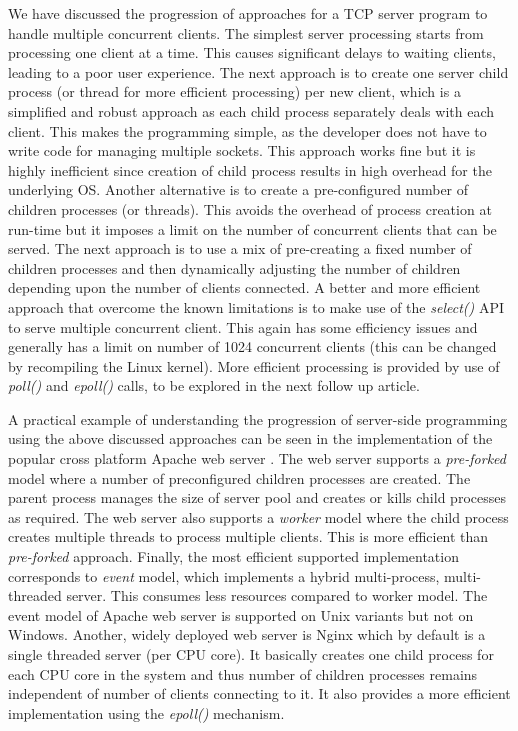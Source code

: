 \begin{multicols}{2}
We have discussed the progression of approaches for a TCP server program to handle multiple concurrent clients. The simplest server processing starts from processing one client at a time. This causes significant delays to waiting clients, leading to a poor user experience. The next approach is to create one server child process (or thread for more efficient processing) per new client, which is a simplified and robust approach as each child process separately deals with each client. This makes the programming simple, as the developer does not have to write code for managing multiple sockets. This approach works fine but it is highly inefficient since creation of child process results in high overhead for the underlying OS. Another alternative is to create a pre-configured number of children processes (or threads). This avoids the overhead of process creation at run-time but it imposes a limit on the number of concurrent clients that can be served. The next approach is to use a mix of pre-creating a fixed number of children processes and then dynamically adjusting the number of children depending upon the number of clients connected. A better and more efficient approach that overcome the known limitations is to make use of the \textit{select()} API to serve multiple concurrent client. This again has some efficiency issues and generally has a limit on number of 1024 concurrent clients (this can be changed by recompiling the Linux kernel). More efficient processing is provided by use of \textit{poll()} and \textit{epoll()} calls, to be explored in the next follow up article.

A practical example of understanding the progression of server-side programming using the above discussed approaches can be seen in the implementation of the popular cross platform Apache web server \cite{art1-key04}. The web server supports a \textit{pre-forked} model where a number of preconfigured children processes are created. The parent process manages the size of server pool and creates or kills child processes as required. The web server also supports a \textit{worker} model where the child process creates multiple threads to process multiple clients. This is more efficient than \textit{pre-forked} approach. Finally, the most efficient supported implementation corresponds to \textit{event} model, which implements a hybrid multi-process, multi-threaded server. This consumes less resources compared to worker model. The event model of Apache web server is supported on Unix variants but not on Windows. Another, widely deployed web server is Nginx \cite{art1-key05} which by default is a single threaded server (per CPU core). It basically creates one child process for each CPU core in the system and thus number of children processes remains independent of number of clients connecting to it. It also provides a more efficient implementation using the \textit{epoll()} mechanism.


\end{multicols}

